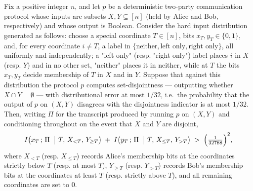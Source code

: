 \begin{theorem}
\label{CommunicationComplexity.Functions.Disjointness.RandomizedLowerBound.one_div_32768_sq_lt_claimInfo_of_distributionalError_le}
\leanok
{}
Fix a positive integer $n$, and let $p$ be a deterministic two-party communication
protocol whose inputs are subsets $X, Y \subseteq [n]$ (held by Alice and Bob,
respectively) and whose output is Boolean. Consider the hard input distribution
generated as follows: choose a special coordinate $T \in [n]$, bits $x_T, y_T \in
\{0,1\}$, and, for every coordinate $i \ne T$, a label in $\{\text{neither}, \text{left
only}, \text{right only}\}$, all uniformly and independently; a "left only" (resp.
"right only") label places $i$ in $X$ (resp. $Y$) and in no other set, "neither" places
it in neither, while at $T$ the bits $x_T, y_T$ decide membership of $T$ in $X$ and in
$Y$. Suppose that against this distribution the protocol $p$ computes set-disjointness —
outputting whether $X \cap Y = \emptyset$ — with distributional error at most $1/32$,
i.e.\ the probability that the output of $p$ on $(X, Y)$ disagrees with the disjointness
indicator is at most $1/32$. Then, writing $\Pi$ for the transcript produced by running
$p$ on $(X, Y)$ and conditioning throughout on the event that $X$ and $Y$ are disjoint,
\[
I\bigl(x_T \,;\, \Pi \,\bigm|\, T,\, X_{<T},\, Y_{\ge T}\bigr) \;+\; I\bigl(y_T \,;\,
\Pi \,\bigm|\, T,\, X_{\le T},\, Y_{>T}\bigr) \;>\; \Bigl(\tfrac{1}{32768}\Bigr)^{2},
\]
where $X_{<T}$ (resp. $X_{\le T}$) records Alice's membership bits at the coordinates
strictly below $T$ (resp. at most $T$), $Y_{\ge T}$ (resp. $Y_{>T}$) records Bob's
membership bits at the coordinates at least $T$ (resp. strictly above $T$), and all
remaining coordinates are set to $0$.
\end{theorem}

